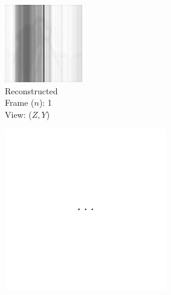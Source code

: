 \documentclass{osa-article}
\begin{document}
\begin{figure}
\begin{subfigure}[t]{0.2\linewidth}
  \end{subfigure}\hfill
  \begin{subfigure}[t]{0.2\linewidth}
    \centering
    \includegraphics[width=\linewidth]{./figures/results/3D_python/no_drift_zelda/1/zx_recon}\caption{Reconstructed\\Frame (\(n\)): 1\\View: (\(Z,Y\))}
  \end{subfigure}
  \begin{subfigure}[t]{0.2\linewidth}
    \centering
    \includegraphics[width=\linewidth]{./figures/results/3D_python/no_drift_zelda/dots/xy}%

\end{subfigure}
\end{figure}
\end{document}
